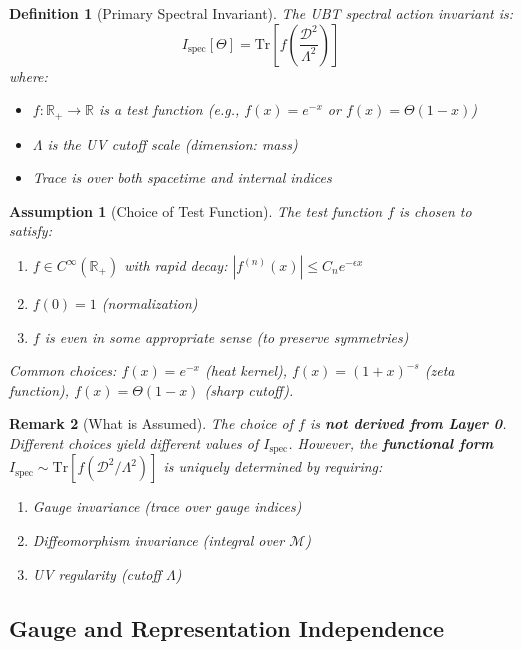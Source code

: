 \documentclass[12pt]{article}
\newtheorem{definition}{Definition}[section]
\newtheorem{remark}[definition]{Remark}
\newtheorem{assumption}{Assumption}[section]
\newcommand{\R}{\mathbb{R}}
\newcommand{\M}{\mathcal{M}}
\newcommand{\Tr}{\mathrm{Tr}}
\begin{document}
\begin{definition}[Primary Spectral Invariant]
\label{def:spectral_invariant}
The UBT spectral action invariant is:
\begin{equation}
I_{\text{spec}}[\Theta] = \Tr\left[ f\left( \frac{\mathcal{D}^2}{\Lambda^2} \right) \right]
\label{eq:spectral_invariant}
\end{equation}
where:
\begin{itemize}
    \item $f: \R_+ \to \R$ is a test function (e.g., $f(x) = e^{-x}$ or $f(x) = \Theta(1-x)$)
    \item $\Lambda$ is the UV cutoff scale (dimension: mass)
    \item Trace is over both spacetime and internal indices
\end{itemize}
\end{definition}

\begin{assumption}[Choice of Test Function]
\label{ass:test_function}
The test function $f$ is chosen to satisfy:
\begin{enumerate}
    \item $f \in C^\infty(\R_+)$ with rapid decay: $|f^{(n)}(x)| \le C_n e^{-\epsilon x}$
    \item $f(0) = 1$ (normalization)
    \item $f$ is even in some appropriate sense (to preserve symmetries)
\end{enumerate}
Common choices: $f(x) = e^{-x}$ (heat kernel), $f(x) = (1+x)^{-s}$ (zeta function), $f(x) = \Theta(1-x)$ (sharp cutoff).
\end{assumption}

\begin{remark}[What is Assumed]
The choice of $f$ is \textbf{not derived from Layer 0}. Different choices yield different values of $I_{\text{spec}}$. However, the \textbf{functional form} $I_{\text{spec}} \sim \Tr[f(\mathcal{D}^2/\Lambda^2)]$ is uniquely determined by requiring:
\begin{enumerate}
    \item Gauge invariance (trace over gauge indices)
    \item Diffeomorphism invariance (integral over $\M$)
    \item UV regularity (cutoff $\Lambda$)
\end{enumerate}
\end{remark}

\subsection{Gauge and Representation Independence}
\end{document}
